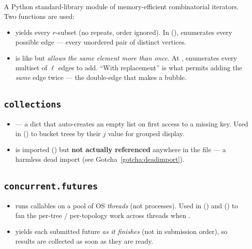 A Python standard-library module of memory-efficient combinatorial iterators. Two
functions are used:

\begin{itemize}
  \item {} yields every $r$-subset (no repeats,
        order ignored). In 
        (),
         enumerates every possible edge ---
        every unordered pair of distinct vertices.
  \item {} is like
         but \emph{allows the same element more than once}. At
        ,
         enumerates
        every multiset of $\ell$ edges to add. ``With replacement'' is what permits
        adding the \emph{same} edge twice --- the double-edge that makes a bubble.
\end{itemize}

\subsection{\texttt{collections}}

\begin{itemize}
  \item {} --- a dict that auto-creates an empty list on
        first access to a missing key. Used in 
        () to bucket trees by their $j$
        value for grouped display.
  \item {} is imported () but
        \textbf{not actually referenced} anywhere in the file --- a harmless dead
        import (see Gotcha~\ref{gotcha:deadimport}).
\end{itemize}

\subsection{\texttt{concurrent.futures}}
\label{sec:parallel}

\begin{itemize}
  \item {} runs callables on a pool of OS
        \emph{threads} (not processes). Used in 
        () and
        () to fan the per-tree /
        per-topology work across threads when .
  \item {} yields each submitted future \emph{as it
        finishes} (not in submission order), so results are collected as soon as
        they are ready.
\end{itemize}

